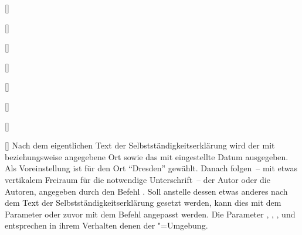 \begin{Declaration}{}
\begin{Declaration}{[]}
\begin{Declaration}{[]}
\begin{Declaration}{[]}
\begin{Declaration}{[]}
\begin{Declaration}[v2.02]{%
  []%
}
\begin{Declaration}[v2.02]{%
  []%
}
\begin{Declaration}[v2.02]{%
  []%
}
\begin{Declaration}{[\PSet]}
Nach dem eigentlichen Text der Selbstständigkeitserklärung wird der mit 
 beziehungsweise  angegebene Ort 
sowie das mit  eingestellte Datum ausgegeben. Als Voreinstellung 
ist für den Ort \enquote{Dresden} gewählt. Danach folgen~-- mit etwas 
vertikalem Freiraum für die notwendige Unterschrift~-- der Autor oder die 
Autoren, angegeben durch den Befehl . Soll anstelle dessen etwas 
anderes nach dem Text der Selbstständigkeitserklärung gesetzt werden, kann dies 
mit dem Parameter  oder zuvor mit dem 
Befehl  angepasst werden. Die Parameter 
, 
, 
, 
 und 
 entsprechen in ihrem Verhalten denen 
der "=Umgebung.
\end{Declaration}
\end{Declaration}
\end{Declaration}
\end{Declaration}
\end{Declaration}
\end{Declaration}
\end{Declaration}
\end{Declaration}
\end{Declaration}

